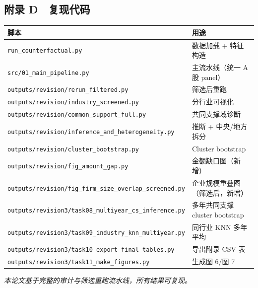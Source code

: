 \documentclass[11pt,a4paper]{ctexart}
\begin{document}
\subsection{附录 D　复现代码}

\begin{center}
\centering
\small
\begin{tabular}{ll}
\toprule
脚本 & 用途 \\
\midrule
\texttt{run\_counterfactual.py} & 数据加载 + 特征构造 \\
\texttt{src/01\_main\_pipeline.py} & 主流水线（统一 A 股 panel） \\
\texttt{outputs/revision/rerun\_filtered.py} & 筛选后重跑 \\
\texttt{outputs/revision/industry\_screened.py} & 分行业可视化 \\
\texttt{outputs/revision/common\_support\_full.py} & 共同支撑域诊断 \\
\texttt{outputs/revision/inference\_and\_heterogeneity.py} & 推断 + 中央/地方拆分 \\
\texttt{outputs/revision/cluster\_bootstrap.py} & Cluster bootstrap \\
\texttt{outputs/revision/fig\_amount\_gap.py} & 金额缺口图（新增） \\
\texttt{outputs/revision/fig\_firm\_size\_overlap\_screened.py} & 企业规模重叠图（筛选后，新增） \\
\texttt{outputs/revision3/task08\_multiyear\_cs\_inference.py} & 多年共同支撑 cluster bootstrap \\
\texttt{outputs/revision3/task09\_industry\_knn\_multiyear.py} & 同行业 KNN 多年平均 \\
\texttt{outputs/revision3/task10\_export\_final\_tables.py} & 导出附录 CSV 表 \\
\texttt{outputs/revision3/task11\_make\_figures.py} & 生成图 6/图 7 \\
\bottomrule
\end{tabular}
\end{center}

\emph{本论文基于完整的审计与筛选重跑流水线，所有结果可复现。}
\end{document}
